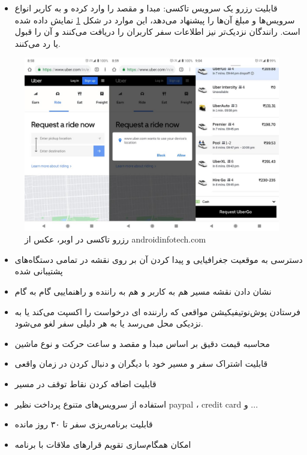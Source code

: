 \begin{itemize}
\item
قابلیت رزرو یک سرویس تاکسی:  مبدا و مقصد را وارد کرده و به کاربر انواع سرویس‌ها و مبلغ آن‌ها را پیشنهاد می‌دهد، این موارد در شکل \ref{fig: uber2} نمایش داده شده است. رانندگان نزدیک‌‌تر نیز اطلاعات سفر کاربران را دریافت می‌کنند و آن را قبول یا رد می‌کنند.
\end{itemize}

\begin{figure}[htb]
\centering
\includegraphics[scale=0.2]{uber2.jpg}
\caption{رزرو تاکسی در اوبر، عکس از  androidinfotech.com}
\label{fig: uber2}
\end{figure}

\begin{itemize}
\item 
دسترسی به موقعیت جغرافیایی و پیدا کردن آن بر روی نقشه در تمامی دستگاه‌های پشتیبانی شده 
\item
نشان دادن نقشه مسیر هم به کاربر و هم به راننده و راهنماییی گام به گام
\item
فرستادن پوش‌نوتیفیکیشن مواقعی که رارننده ای درخواست را اکسپت می‌کند یا به نزدیکی محل می‌رسد یا به هر دلیلی سفر لغو می‌شود.
\item
محاسبه قیمت دقیق بر اساس مبدا و مقصد و ساعت حرکت و نوع ماشین
\item 
قابلیت اشتراک سفر و مسیر خود با دیگران و دنبال کردن در زمان واقعی
\item
قابلیت اضافه کردن نقاط توقف در مسیر 
\item
استفاده از سرویس‌های متنوع پرداخت نظیر paypal ، credit card و ...
\item 
قابلیت برنامه‌ریزی سفر تا ۳۰ روز مانده 
\item 
امکان همگام‌سازی تقویم قرارهای ملاقات با برنامه 
\end{itemize}




